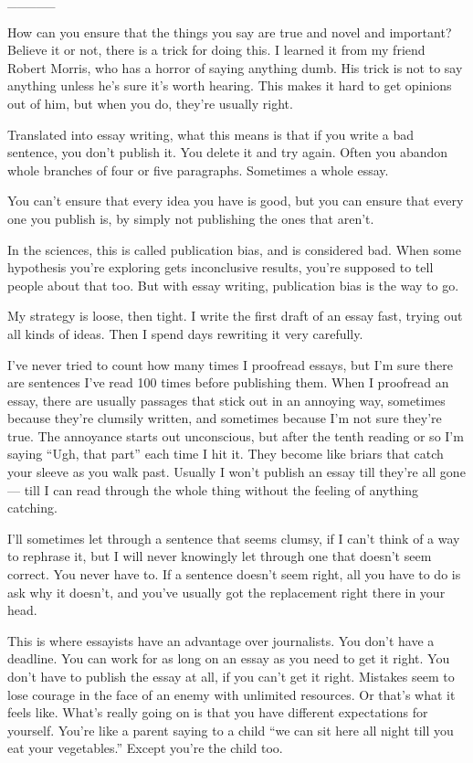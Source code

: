 \_\_\_\_\_

How can you ensure that the things you say are true and novel and
important? Believe it or not, there is a trick for doing this. I learned
it from my friend Robert Morris, who has a horror of saying anything
dumb. His trick is not to say anything unless he's sure it's worth
hearing. This makes it hard to get opinions out of him, but when you do,
they're usually right.

Translated into essay writing, what this means is that if you write a
bad sentence, you don't publish it. You delete it and try again. Often
you abandon whole branches of four or five paragraphs. Sometimes a whole
essay.

You can't ensure that every idea you have is good, but you can ensure
that every one you publish is, by simply not publishing the ones that
aren't.

In the sciences, this is called publication bias, and is considered bad.
When some hypothesis you're exploring gets inconclusive results, you're
supposed to tell people about that too. But with essay writing,
publication bias is the way to go.

My strategy is loose, then tight. I write the first draft of an essay
fast, trying out all kinds of ideas. Then I spend days rewriting it very
carefully.

I've never tried to count how many times I proofread essays, but I'm
sure there are sentences I've read 100 times before publishing them.
When I proofread an essay, there are usually passages that stick out in
an annoying way, sometimes because they're clumsily written, and
sometimes because I'm not sure they're true. The annoyance starts out
unconscious, but after the tenth reading or so I'm saying ``Ugh, that
part'' each time I hit it. They become like briars that catch your
sleeve as you walk past. Usually I won't publish an essay till they're
all gone --- till I can read through the whole thing without the feeling
of anything catching.

I'll sometimes let through a sentence that seems clumsy, if I can't
think of a way to rephrase it, but I will never knowingly let through
one that doesn't seem correct. You never have to. If a sentence doesn't
seem right, all you have to do is ask why it doesn't, and you've usually
got the replacement right there in your head.

This is where essayists have an advantage over journalists. You don't
have a deadline. You can work for as long on an essay as you need to get
it right. You don't have to publish the essay at all, if you can't get
it right. Mistakes seem to lose courage in the face of an enemy with
unlimited resources. Or that's what it feels like. What's really going
on is that you have different expectations for yourself. You're like a
parent saying to a child ``we can sit here all night till you eat your
vegetables.'' Except you're the child too.

